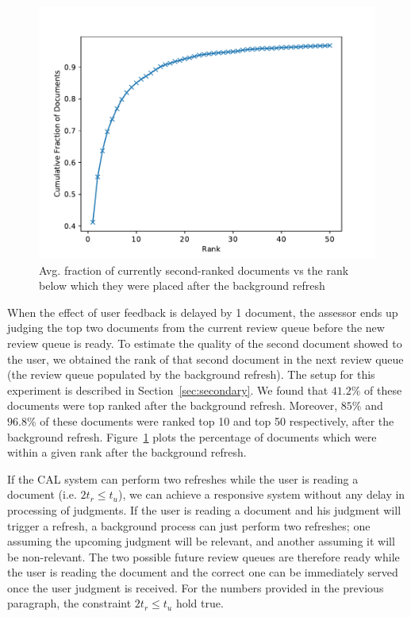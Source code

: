 \begin{figure}[h]
\includegraphics[width=\textwidth]{plots/top_doc_avg_rank.pdf}
\caption{Avg. fraction of currently second-ranked documents vs the rank below
which they were placed after the background refresh}
\label{plot:async}
\end{figure}

When the effect of user feedback is delayed by 1 document, the assessor ends up
judging the top two documents from the current review queue before the new
review queue is ready. To estimate the quality of the second
document showed to the user, we obtained the rank of that second document
in the next review queue (the review queue populated by the background refresh).
The setup for this experiment is described in Section~\ref{sec:secondary}. We found that
$41.2\%$ of these documents were top ranked after the background refresh.
Moreover, $85\%$ and $96.8\%$ of these documents were ranked top 10 and top 50
respectively, after the background refresh. Figure~\ref{plot:async} plots the
percentage of documents which were within a given rank after the
background refresh.



If the CAL system can perform two refreshes while the user is reading a
document (i.e. $2t_r \le t_u$), we can achieve a responsive system without any
delay in processing of judgments. If the user is reading a document and his
judgment will trigger a refresh, a background process can just perform two refreshes;
one assuming the upcoming judgment will be relevant, and another assuming it
will be non-relevant.  The two possible future review queues are therefore ready
while the user is reading the document and the correct one can be immediately
served once the user judgment is received. For the numbers provided in the
previous paragraph, the constraint $2t_r \le t_u$ hold true.

